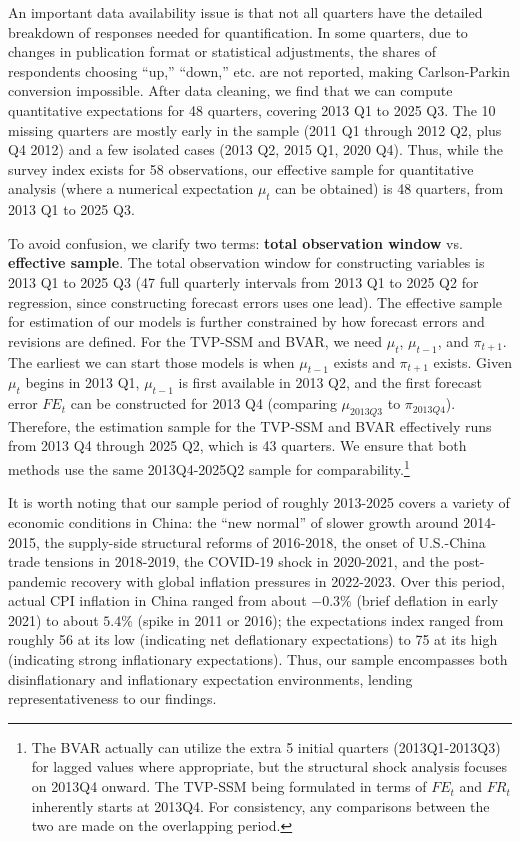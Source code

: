\documentclass[12pt]{article}
\begin{document}
An important data availability issue is that not all quarters have the detailed breakdown of responses needed for quantification. In some quarters, due to changes in publication format or statistical adjustments, the shares of respondents choosing “up,” “down,” etc. are not reported, making Carlson-Parkin conversion impossible. After data cleaning, we find that we can compute quantitative expectations for 48 quarters, covering 2013 Q1 to 2025 Q3. The 10 missing quarters are mostly early in the sample (2011 Q1 through 2012 Q2, plus Q4 2012) and a few isolated cases (2013 Q2, 2015 Q1, 2020 Q4). Thus, while the survey index exists for 58 observations, our effective sample for quantitative analysis (where a numerical expectation $\mu_t$ can be obtained) is 48 quarters, from 2013 Q1 to 2025 Q3.

To avoid confusion, we clarify two terms: \textbf{total observation window} vs. \textbf{effective sample}. The total observation window for constructing variables is 2013 Q1 to 2025 Q3 (47 full quarterly intervals from 2013 Q1 to 2025 Q2 for regression, since constructing forecast errors uses one lead). The effective sample for estimation of our models is further constrained by how forecast errors and revisions are defined. For the TVP-SSM and BVAR, we need $\mu_t$, $\mu_{t-1}$, and $\pi_{t+1}$. The earliest we can start those models is when $\mu_{t-1}$ exists and $\pi_{t+1}$ exists. Given $\mu_{t}$ begins in 2013 Q1, $\mu_{t-1}$ is first available in 2013 Q2, and the first forecast error $FE_t$ can be constructed for 2013 Q4 (comparing $\mu_{2013Q3}$ to $\pi_{2013Q4}$). Therefore, the estimation sample for the TVP-SSM and BVAR effectively runs from 2013 Q4 through 2025 Q2, which is 43 quarters. We ensure that both methods use the same 2013Q4-2025Q2 sample for comparability.\footnote{The BVAR actually can utilize the extra 5 initial quarters (2013Q1-2013Q3) for lagged values where appropriate, but the structural shock analysis focuses on 2013Q4 onward. The TVP-SSM being formulated in terms of $FE_t$ and $FR_t$ inherently starts at 2013Q4. For consistency, any comparisons between the two are made on the overlapping period.}

It is worth noting that our sample period of roughly 2013-2025 covers a variety of economic conditions in China: the “new normal” of slower growth around 2014-2015, the supply-side structural reforms of 2016-2018, the onset of U.S.-China trade tensions in 2018-2019, the COVID-19 shock in 2020-2021, and the post-pandemic recovery with global inflation pressures in 2022-2023. Over this period, actual CPI inflation in China ranged from about $-0.3\%$ (brief deflation in early 2021) to about $5.4\%$ (spike in 2011 or 2016); the expectations index ranged from roughly 56 at its low (indicating net deflationary expectations) to 75 at its high (indicating strong inflationary expectations). Thus, our sample encompasses both disinflationary and inflationary expectation environments, lending representativeness to our findings.
\end{document}
